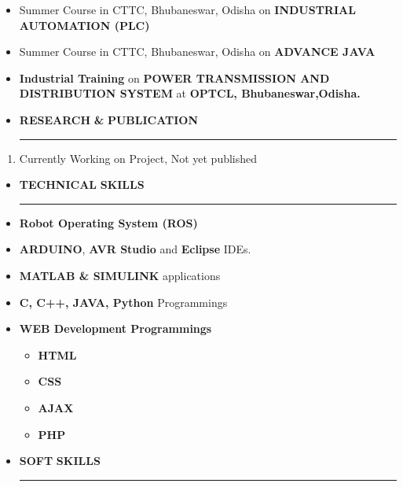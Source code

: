 \documentclass[a4paper]{article}
\begin{document}
 \renewcommand{\labelitemi}{\textbullet}
 \begin{itemize}
   \item Summer Course in CTTC, Bhubaneswar, Odisha on \textbf{INDUSTRIAL AUTOMATION (PLC)}
   \item Summer Course in CTTC, Bhubaneswar, Odisha on \textbf{ADVANCE JAVA}
   \item \textbf{Industrial Training} on \textbf{POWER TRANSMISSION AND DISTRIBUTION SYSTEM} at \textbf{OPTCL, Bhubaneswar,Odisha.}  
 \end{itemize}

 \renewcommand{\labelitemi}{\texttt{[image: jnj.JPG]}}
\begin{itemize}
  \vspace{4ex}
  \item \textbf{\huge{R}}\textbf{\large ESEARCH} \textbf{\LARGE{\&}} \textbf{\huge{P}}\textbf{\large UBLICATION}
  {\color{mypink1}
  \rule{8.5cm}{0.5mm}}
 \end{itemize}
 \begin{enumerate}
     \item Currently Working on Project, Not yet published
 \end{enumerate}
 
 \renewcommand{\labelitemi}{\texttt{[image: jnj.JPG]}}
\begin{itemize}
  \vspace{4ex}
  \item \textbf{\huge{T}}\textbf{\large ECHNICAL} \textbf{\huge{S}}\textbf{\large KILLS}
  {\color{mypink1}
  \rule{10.5cm}{0.5mm}}
 \end{itemize}
 
 \renewcommand{\labelitemi}{\textbullet}
 \begin{itemize}
   \item \textbf{Robot Operating System (ROS)}
   \item \textbf{ARDUINO}, \textbf{AVR Studio} and \textbf{Eclipse} IDEs.
   \item \textbf{MATLAB \& SIMULINK} applications
   \item \textbf{C, C++, JAVA, Python} Programmings
   \item \textbf{WEB Development Programmings}
   \begin{itemize}
     \item \textbf{HTML}
     \item \textbf{CSS}
     \item \textbf{AJAX}
     \item \textbf{PHP}
   \end{itemize}
 \end{itemize}
 \renewcommand{\labelitemi}{\texttt{[image: jnj.JPG]}}
\begin{itemize}
  \vspace{4ex}
  \item \textbf{\huge{S}}\textbf{\large OFT} \textbf{\huge{S}}\textbf{\large KILLS}
  {\color{mypink1}
  \rule{12cm}{0.5mm}}
 \end{itemize}
 
\end{document}
